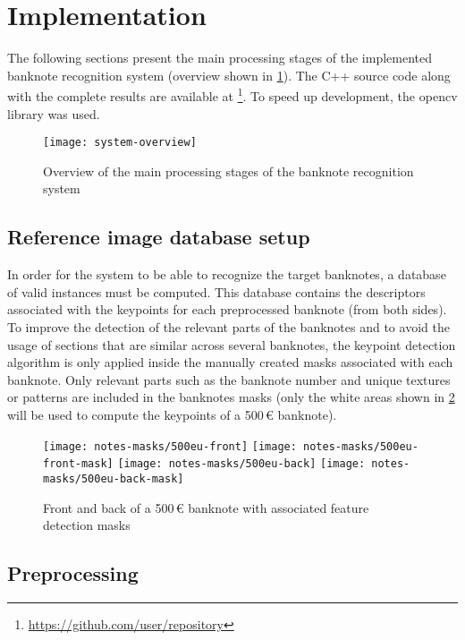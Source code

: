 \section{Implementation}\label{sec:implementation}

The following sections present the main processing stages of the implemented banknote recognition system (overview shown in \cref{fig:system-overview}). The C++ source code along with the complete results are available at \footnote{\url{https://github.com/user/repository}}. To speed up development, the \gls{opencv} library was used.

\begin{figure}[!ht]
	\centering
	\texttt{[image: system-overview]}
	\caption{Overview of the main processing stages of the banknote recognition system}
	\label{fig:system-overview}
\end{figure}


\subsection{Reference image database setup}

In order for the system to be able to recognize the target banknotes, a database of valid instances must be computed. This database contains the descriptors associated with the keypoints for each preprocessed banknote (from both sides). To improve the detection of the relevant parts of the banknotes and to avoid the usage of sections that are similar across several banknotes, the keypoint detection algorithm is only applied inside the manually created masks associated with each banknote. Only relevant parts such as the banknote number and unique textures or patterns are included in the banknotes masks (only the white areas shown in \cref{fig:banknote-feature-detection-mask-500-front} will be used to compute the keypoints of a 500\,\euro{} banknote).


\begin{figure}[H]
	\centering
	\texttt{[image: notes-masks/500eu-front]}
	\texttt{[image: notes-masks/500eu-front-mask]}
	\texttt{[image: notes-masks/500eu-back]}
	\texttt{[image: notes-masks/500eu-back-mask]}
	\caption{Front and back of a 500\,\euro{} banknote with associated feature detection masks}
	\label{fig:banknote-feature-detection-mask-500-front}
\end{figure}


\subsection{Preprocessing}

